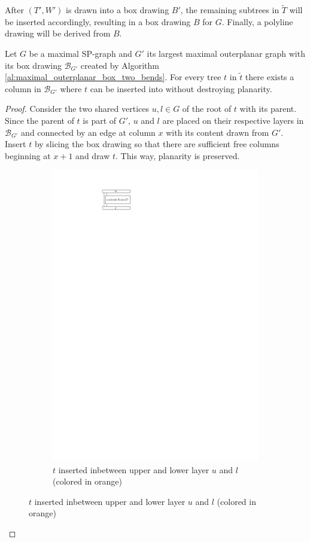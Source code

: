 After $(T',W')$ is drawn into a box drawing $B'$, the remaining subtrees in $\tilde{T}$ will be inserted accordingly, resulting in a box drawing $B$ for $G$. Finally, a polyline drawing will be derived from $B$.

\begin{lemma}
	Let $G$ be a maximal SP-graph and $G'$ its largest maximal outerplanar graph with its box drawing $\mathcal{B}_{G'}$ created by Algorithm \ref{al:maximal_outerplanar_box_two_bends}. For every tree $t$ in $\tilde{t}$ there exists a column in $\mathcal{B}_{G'}$ where $t$ can be inserted into without destroying planarity. 
\end{lemma}
\begin{proof}
	Consider the two shared vertices $u,l \in G$ of the root of $t$ with its parent. Since the parent of $t$ is part of $G'$, $u$ and $l$ are placed on their respective layers in $\mathcal{B}_{G'}$ and connected by an edge at column $x$ with its content drawn from $G'$. Insert $t$ by slicing the box drawing so that there are sufficient free columns beginning at $x+1$ and draw $t$. This way, planarity is preserved. 
	
	\begin{figure}[H]
	\centering
	\begin{subfigure}{\textwidth}
		\centering
		\includegraphics[page=2,width=0.6\linewidth]{graphics/t_insertion_into_maximal_outerplanar.pdf}
		\caption{$t$ inserted inbetween upper and lower layer $u$ and $l$ (colored in orange)}
	\end{subfigure}
	
\end{figure}
	
\end{proof}

